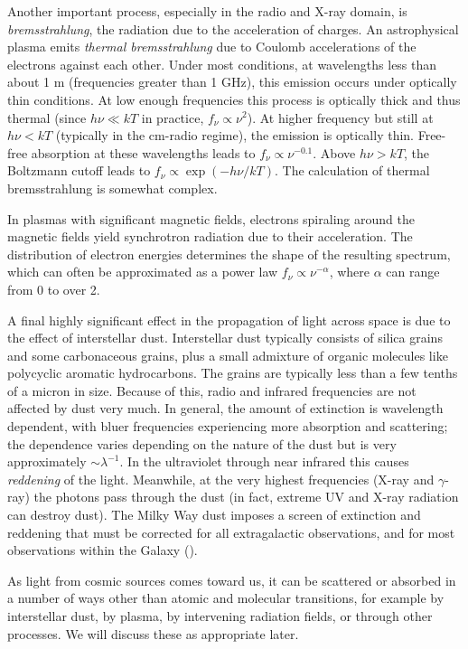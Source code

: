Another important process, especially in the radio and X-ray domain,
is {\it bremsstrahlung}, the radiation due to the acceleration of
charges. An astrophysical plasma emits {\it thermal bremsstrahlung}
due to Coulomb accelerations of the electrons against each
other. Under most conditions, at wavelengths less than about 1 m
(frequencies greater than 1 GHz), this emission occurs under optically
thin conditions. At low enough frequencies this process is optically
thick and thus thermal (since $h\nu \ll kT$ in practice,
$f_\nu\propto \nu^2$). At higher frequency but still at $h\nu < kT$
(typically in the cm-radio regime), the emission is optically
thin. Free-free absorption at these wavelengths leads to
$f_\nu\propto \nu^{-0.1}$. Above $h\nu> kT$, the Boltzmann cutoff
leads to $f_\nu\propto \exp(-h\nu/kT)$. The calculation of thermal
bremsstrahlung is somewhat complex.

In plasmas with significant magnetic fields, electrons spiraling
around the magnetic fields yield synchrotron radiation due to their
acceleration. The distribution of electron energies determines the
shape of the resulting spectrum, which can often be approximated as a
power law $f_\nu \propto \nu^{-\alpha}$, where $\alpha$ can range from
0 to over 2.

A final highly significant effect in the propagation of light across
space is due to the effect of interstellar dust. Interstellar dust
typically consists of silica grains and some carbonaceous grains, plus
a small admixture of organic molecules like polycyclic aromatic
hydrocarbons. The grains are typically less than a few tenths of a
micron in size. Because of this, radio and infrared frequencies are
not affected by dust very much. In general, the amount of extinction
is wavelength dependent, with bluer frequencies experiencing more
absorption and scattering; the dependence varies depending on the
nature of the dust but is very approximately $\sim \lambda^{-1}$. In
the ultraviolet through near infrared this causes {\it reddening} of the
light. Meanwhile, at the very highest frequencies (X-ray and
$\gamma$-ray) the photons pass through the dust (in fact, extreme UV
and X-ray radiation can destroy dust). The Milky Way dust imposes a
screen of extinction and reddening that must be corrected for all
extragalactic observations, and for most observations within the
Galaxy (\citealt{schlegel98a}). 

As light from cosmic sources comes toward us, it can be scattered or
absorbed in a number of ways other than atomic and molecular
transitions, for example by interstellar dust, by plasma, by
intervening radiation fields, or through other processes. We will
discuss these as appropriate later.
  
